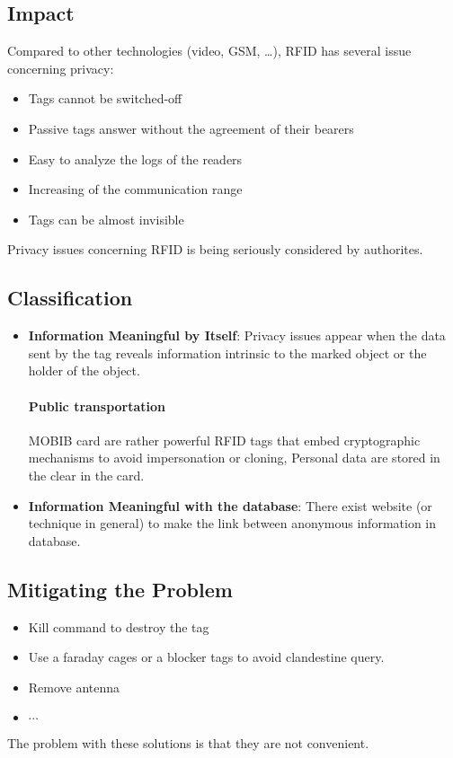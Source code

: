 
\subsection{Impact}
Compared to other technologies (video, GSM, \ldots), RFID has several issue
concerning privacy:
\begin{itemize}
    \item Tags cannot be switched-off
    \item Passive tags answer without the agreement of their bearers
    \item Easy to analyze the logs of the readers
    \item Increasing of the communication range
    \item Tags can be almost invisible
\end{itemize}

Privacy issues concerning RFID is being seriously considered by authorites.

\subsection{Classification}

\begin{itemize}
    \item \textbf{Information Meaningful by Itself}: Privacy issues
        appear when the data sent by the tag reveals information
        intrinsic to the marked object or the holder of the object.

        \paragraph{Public transportation}
        MOBIB card are rather powerful RFID tags that embed
        cryptographic mechanisms to avoid impersonation or cloning,
        Personal data are stored in the clear in the card.

    \item \textbf{Information Meaningful with the database}: There exist
        website (or technique in general) to make the link between
        anonymous information in database.
\end{itemize}

\subsection{Mitigating the Problem}
\begin{itemize}
    \item Kill command to destroy the tag
    \item Use a faraday cages or a blocker tags to
        avoid clandestine query.
    \item Remove antenna
    \item $\cdots$
\end{itemize}
The problem with these solutions is that they are not convenient.

